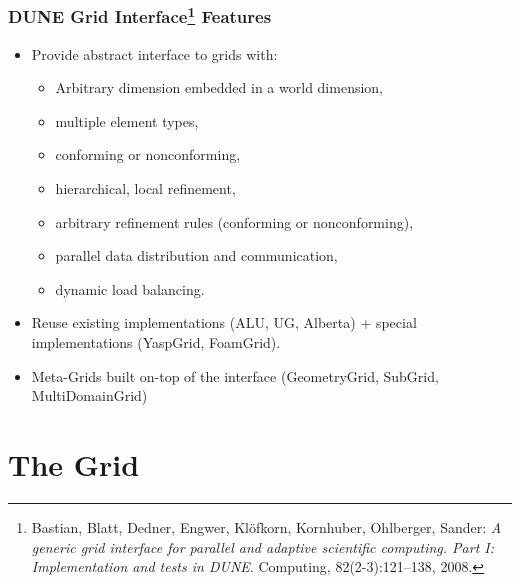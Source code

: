 \documentclass[aspectratio=169,11pt]{beamer}
\theoremstyle{definition}
\begin{document}
\begin{frame}
\frametitle{DUNE Grid Interface\footnote{\tiny Bastian,
Blatt, Dedner, Engwer, Kl{\"{o}}fkorn, Kornhuber,
Ohlberger, Sander: {\em A generic grid interface for parallel and adaptive
  scientific computing. Part {I}: Implementation and tests in {DUNE}}.
  Computing, 82(2-3):121--138, 2008.} Features}
\begin{itemize}
\item Provide abstract interface to grids with:
\begin{itemize}
\item Arbitrary dimension embedded in a world dimension,
\item multiple element types,
\item conforming or nonconforming,
\item hierarchical, local refinement,
\item arbitrary refinement rules (conforming or nonconforming),
\item parallel data distribution and communication,
\item dynamic load balancing.
\end{itemize}
\item Reuse existing implementations (ALU, UG, Alberta) + special
implementations (YaspGrid, FoamGrid).
\item Meta-Grids built on-top of the interface (GeometryGrid, SubGrid,
  MultiDomainGrid)
\end{itemize}
\end{frame}

\section{The Grid}
\end{document}
